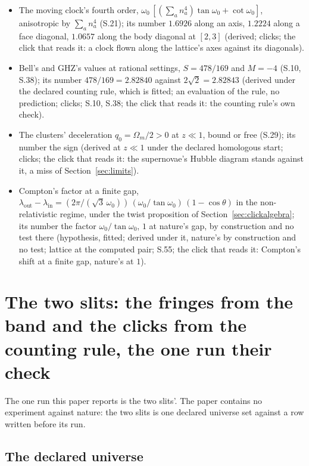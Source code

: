 \documentclass[pdflatex,sn-mathphys-num]{sn-jnl}
\theoremstyle{thmstyleone}
\theoremstyle{thmstyletwo}
\begin{document}
\begin{itemize}[nosep,leftmargin=1.2em]
\item The moving clock's fourth order, $\omega_0\,[(\sum_a n_a^4)\tan\omega_0 + \cot\omega_0]$, anisotropic by $\sum_a n_a^4$ (S.21); its number $1.6926$ along an axis, $1.2224$ along a face diagonal, $1.0657$ along the body diagonal at $[2, 3]$ (derived; clicks; the click that reads it: a clock flown along the lattice's axes against its diagonals).
\item Bell's and GHZ's values at rational settings, $S = 478 / 169$ and $M = -4$ (S.10, S.38); its number $478 / 169 = 2.82840$ against $2\sqrt 2 = 2.82843$ (derived under the declared counting rule, which is fitted; an evaluation of the rule, no prediction; clicks; S.10, S.38; the click that reads it: the counting rule's own check).
\item The clusters' deceleration $q_0 = \Omega_m / 2 > 0$ at $z \ll 1$, bound or free (S.29); its number the sign (derived at $z \ll 1$ under the declared homologous start; clicks; the click that reads it: the supernovae's Hubble diagram stands against it, a miss of Section~\ref{sec:limits}).
\item Compton's factor at a finite gap, $\lambda_{\mathrm{out}} - \lambda_{\mathrm{in}} = (2\pi / (\sqrt 3\,\omega_0))\,(\omega_0 / \tan\omega_0)\,(1 - \cos\theta)$ in the non-relativistic regime, under the twist proposition of Section~\ref{sec:clickalgebra}; its number the factor $\omega_0 / \tan\omega_0$, $1$ at nature's gap, by construction and no test there (hypothesis, fitted; derived under it, nature's by construction and no test; lattice at the computed pair; S.55; the click that reads it: Compton's shift at a finite gap, nature's at $1$).
\end{itemize}
\section{The two slits: the fringes from the band and the clicks from the counting rule, the one run their check}\label{sec:slits}

The one run this paper reports is the two slits'. The paper contains no experiment against nature: the two slits is one declared universe set against a row written before its run.

\subsection{The declared universe}\label{sec:slits-file}
\end{document}
